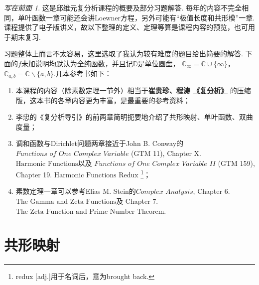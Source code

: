 \theoremstyle{remark}
\newtheorem*{foreword}{写在前面}
\def\mapsfrom{\longleftarrow{\raisebox{0.4pt}{$\hspace{-6pt}\shortmid$}}}

\begin{foreword}

\qquad 这是邱维元复分析课程的概要及部分习题解答.
每年的内容不完全相同，单叶函数一章可能还会讲Loewner方程，另外可能有``极值长度和共形模''一章.
课程提供了电子版讲义，故以下整理的定义、定理等算是课程内容的预览，也可用于期末复习.

\qquad 习题整体上而言不太容易，这里选取了我认为较有难度的题目给出简要的解答.
下面的$f$未加说明均默认为全纯函数，并且记$\mathbb{D}$是单位圆盘，
$\mathbb{C}_\infty=\mathbb{C}\cup\{\infty\}$，
$\mathbb{C}_{a,b}=\mathbb{C}\backslash\{a,b\}$.几本参考书如下：
\begin{enumerate}
\item 本课程的内容（除素数定理一节外）相当于\textbf{崔贵珍、程涛
\href{https://book.douban.com/subject/26775353/}{\textcolor{333399}{《复分析》}}}
的压缩版，这本书的各章内容更为丰富，是最重要的参考资料；

\item 李忠的《复分析导引》的前两章简明扼要地介绍了共形映射、单叶函数、双曲度量；

\item 调和函数与Dirichlet问题两章接近于John B. Conway的
$\textit{Functions of One Complex Variable}$ (GTM 11), 
Chapter X. $\text{Harmonic Functions}$以及
$\textit{Functions of One Complex Variable II}$ (GTM 159), 
Chapter 19. $\text{Harmonic Functions Redux}$
\footnote{redux [adj.]用于名词后，意为brought back.}；

\item 素数定理一章可以参考Elias M. Stein的$\textit{Complex Analysis}$, 
Chapter 6. $\text{The Gamma and Zeta Functions}$及
Chapter 7. $\text{The Zeta Function and Prime Number Theorem}$.
\end{enumerate}
\end{foreword}

\section{共形映射}

